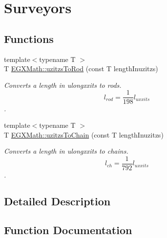 \hypertarget{group___e_g_x_math-_conversions-_length_conversions-uzitzs-_surveyors}{}\section{Surveyors}
\label{group___e_g_x_math-_conversions-_length_conversions-uzitzs-_surveyors}
\subsection*{Functions}
\begin{DoxyCompactItemize}
\item 
{\footnotesize template$<$typename T $>$ }\\T \mbox{\hyperlink{group___e_g_x_math-_conversions-_length_conversions-uzitzs-_surveyors_gaf6062ab067930d296074de9e8301871d}{E\+G\+X\+Math\+::uzitzs\+To\+Rod}} (const T length\+Inuzitzs)
\begin{DoxyCompactList}\small\item\em Converts a length in ulongxxits to rods. \[ l_{rod}= \frac{1}{198} l_{uxxits} \]. \end{DoxyCompactList}\item 
{\footnotesize template$<$typename T $>$ }\\T \mbox{\hyperlink{group___e_g_x_math-_conversions-_length_conversions-uzitzs-_surveyors_ga34cbd9480a12684fe4138ba45a56692b}{E\+G\+X\+Math\+::uzitzs\+To\+Chain}} (const T length\+Inuzitzs)
\begin{DoxyCompactList}\small\item\em Converts a length in ulongxxits to chains. \[ l_{ch}= \frac{1}{792} l_{uxxits} \]. \end{DoxyCompactList}\end{DoxyCompactItemize}


\subsection{Detailed Description}


\subsection{Function Documentation}
\mbox{\label{group___e_g_x_math-_conversions-_length_conversions-uzitzs-_surveyors_ga34cbd9480a12684fe4138ba45a56692b}} 
